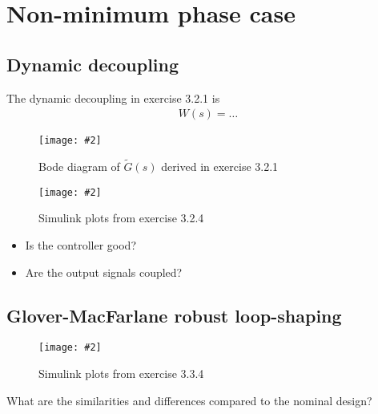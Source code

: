 \documentclass[11pt,a4paper]{article}
\newcommand{\image}[3]{
	\begin{figure}[!ht]
		\centering
	    \texttt{[image: \#2]}
		\caption{#3}
		\label{fig:#2}
	\end{figure}
}
\begin{document}
	
\section*{Non-minimum phase case}
\subsection*{Dynamic decoupling}
\par The dynamic decoupling in exercise 3.2.1 is
	\begin{align*}
		W(s) = \ldots
	\end{align*}

	\image{0.5}{321}{Bode diagram of $\tilde{G}(s)$ derived in exercise 3.2.1}
	\image{0.5}{321}{Simulink plots from exercise 3.2.4}

	\begin{itemize}
		\item Is the controller good?
		\item Are the output signals coupled?
	\end{itemize}

\subsection*{Glover-MacFarlane robust loop-shaping}
	\image{0.5}{321}{Simulink plots from exercise 3.3.4}

\par What are the similarities and differences compared to the nominal design?
	\par\dotfill\par\dotfill
\end{document}
